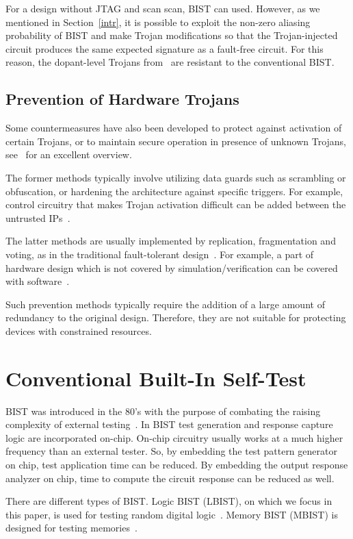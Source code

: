 \documentclass[a4paper]{llncs}
\begin{document}
For a design without JTAG and scan scan, BIST can used. However, as we mentioned in Section~\ref{intr}, it is possible to exploit the non-zero aliasing probability of BIST and make Trojan modifications so that the Trojan-injected circuit produces the same expected signature as a fault-free circuit. For this reason, the dopant-level Trojans from~\cite{BeRPB13} are resistant to the conventional BIST.

\subsection{Prevention of Hardware Trojans}

Some countermeasures have also been developed to protect against activation of certain Trojans,
or to maintain secure operation in presence of unknown Trojans, see~\cite{BeHN11} for an excellent overview. 

The former methods typically involve utilizing data guards such as scrambling or obfuscation, or hardening the architecture against specific triggers. For example, control circuitry that makes Trojan activation difficult can be added between the untrusted IPs~\cite{Wa11}.

The latter methods are usually implemented by replication, fragmentation and voting, as in the traditional fault-tolerant design~\cite{Du13book}. For example, a part of hardware design which is not covered by simulation/verification can be covered with software~\cite{HiKM10}. 

Such prevention methods typically require the addition of a large amount of redundancy to the original design. Therefore, they are not suitable for protecting devices with constrained resources.

\section{Conventional Built-In Self-Test} \label{bist}

BIST was introduced in the 80's with the purpose of combating the raising complexity of external testing~\cite{McC85}. In BIST test generation and response capture logic are incorporated on-chip. On-chip circuitry usually works at a much higher frequency than
an external tester. So, by embedding the test pattern generator on chip, test application time can be reduced. By embedding the output response analyzer on chip, time to compute the circuit
response can be reduced as well.

There are different types of BIST. Logic BIST (LBIST), on which we focus in this paper, is used for testing random digital logic~\cite{RaT98}. Memory BIST (MBIST) is designed for testing memories~\cite{Sh02}.
\end{document}
